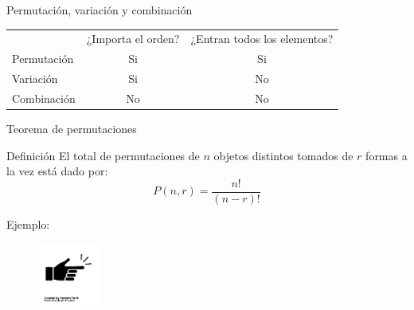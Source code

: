 \documentclass{beamer}
\begin{document}
\begin{frame}{Permutación, variación y combinación}

  \begin{tabular}{lcc}
     & ¿Importa el orden?  & ¿Entran todos los elementos? \\
     Permutación & Si                  &   Si    \\
     Variación   & Si                  &   No    \\
     Combinación & No                  &   No
  \end{tabular}

\end{frame}

\begin{frame}{Teorema de permutaciones}

  \begin{block}{Definición}
    El total de permutaciones de $n$ objetos distintos tomados de $r$ formas a la
    vez está dado por:
    \begin{equation}
        P(n,r) =  \frac{n !}{(n - r)!}
    \end{equation}
  \end{block}

  Ejemplo:
  
  \begin{figure}
    \includegraphics[width=2cm,angle=0,trim={1mm 216mm 1mm 200mm},clip]{figures/example-finger.png}
  \end{figure}

\end{frame}
\end{document}
